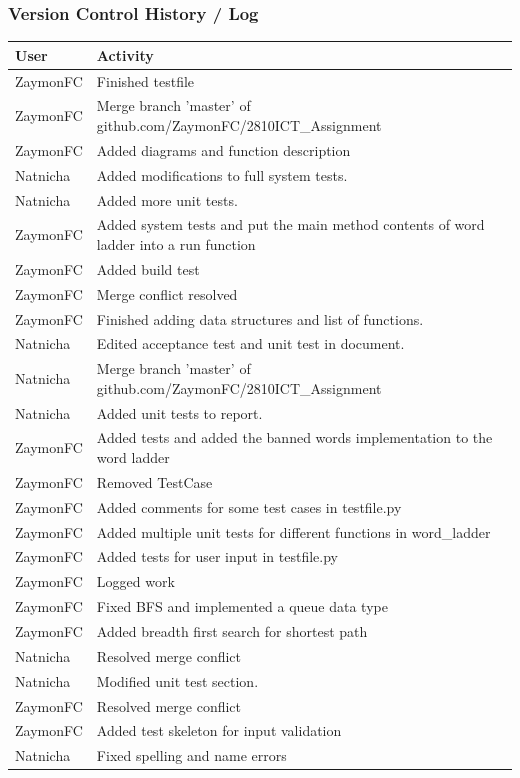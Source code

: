 \documentclass[12pt, a4]{report}
\begin{document}
		\subsubsection{Version Control History / Log}
	\begin{tabular}{ | p{2cm} | p{13cm} | }
		\hline
		User & Activity \\
		\hline
		ZaymonFC & Finished testfile \\ 
		ZaymonFC & Merge branch 'master' of github.com/ZaymonFC/2810ICT\_Assignment \\ 
		ZaymonFC & Added diagrams and function description \\ 
		Natnicha & Added modifications to full system tests. \\ 
		Natnicha & Added more unit tests. \\ 
		ZaymonFC & Added system tests and put the main method contents of word ladder into a run function \\ 
		ZaymonFC & Added build test \\ 
		ZaymonFC & Merge conflict resolved \\ 
		ZaymonFC & Finished adding data structures and list of functions. \\ 
		Natnicha & Edited acceptance test and unit test in document. \\ 
		Natnicha & Merge branch 'master' of github.com/ZaymonFC/2810ICT\_Assignment \\ 
		Natnicha & Added unit tests to report. \\ 
		ZaymonFC & Added tests and added the banned words implementation to the word ladder \\ 
		ZaymonFC & Removed TestCase \\ 
		ZaymonFC & Added comments for some test cases in testfile.py \\ 
		ZaymonFC & Added multiple unit tests for different functions in word\_ladder \\ 
		ZaymonFC & Added tests for user input in testfile.py \\ 
		ZaymonFC & Logged work \\ 
		ZaymonFC & Fixed BFS and implemented a queue data type \\ 
		ZaymonFC & Added breadth first search for shortest path \\ 
		Natnicha & Resolved merge conflict \\ 
		Natnicha & Modified unit test section. \\ 
		ZaymonFC & Resolved merge conflict \\ 
		ZaymonFC & Added test skeleton for input validation \\ 
		Natnicha & Fixed spelling and name errors \\ 
		\hline 
	\end{tabular}
	
\end{document}
